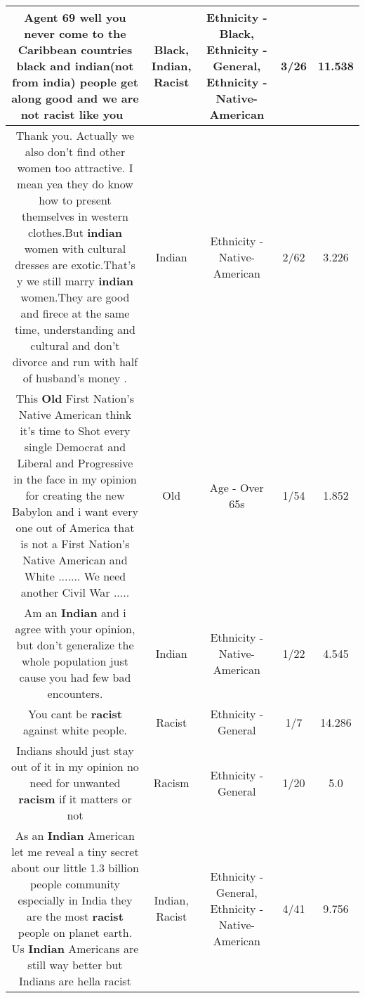 \documentclass[11pt]{article}
\newlength\mylength
\begin{document}
\begin{center}
\begin{longtable}{|C{.65\mylength}|C{.30\mylength}|C{.12\mylength}|C{.12\mylength}|C{.12\mylength}|}
  \small Agent 69 well you never come to the Caribbean countries \textbf{black} and \textbf{indian}(not from india) people get along good and we are not \textbf{racist} like you🤦‍♂️\normalsize   & Black, Indian, Racist & Ethnicity - Black, Ethnicity - General, Ethnicity - Native-American & 3/26 & 11.538 \\  \hline
  \small Thank you. Actually we also don't find other women too attractive. I mean yea they do know how to present themselves in western clothes.But \textbf{indian} women with cultural dresses are exotic.That's y we still marry \textbf{indian} women.They are good and firece at the same time, understanding and cultural and don't divorce and run with half of husband's money .\normalsize   & Indian & Ethnicity - Native-American & 2/62 & 3.226 \\  \hline
  \small This \textbf{Old} First Nation's Native American  think it's time to Shot every single  Democrat and Liberal and Progressive in the face in my opinion for creating the new Babylon and i want every one out of America  that is not a First Nation's Native American and White  ....... We need another Civil War .....\normalsize   & Old & Age - Over 65s & 1/54 & 1.852 \\  \hline
  \small Am an \textbf{Indian} and i agree with your opinion, but don't generalize the whole population just cause you had few bad encounters.\normalsize   & Indian & Ethnicity - Native-American & 1/22 & 4.545 \\  \hline
  \small You cant be \textbf{racist} against white people.\normalsize   & Racist & Ethnicity - General & 1/7 & 14.286 \\  \hline
  \small Indians should just stay out of it in my opinion no need for unwanted \textbf{racism} if it matters or not\normalsize   & Racism & Ethnicity - General & 1/20 & 5.0 \\  \hline
  \small As an \textbf{Indian} American let me reveal a tiny secret about our little 1.3 billion people community especially in India  they are the most \textbf{racist} people on planet earth. Us \textbf{Indian} Americans are still way better but Indians are hella racist\normalsize   & Indian, Racist & Ethnicity - General, Ethnicity - Native-American & 4/41 & 9.756 \\  \hline

\end{longtable}
\end{center}
\end{document}
